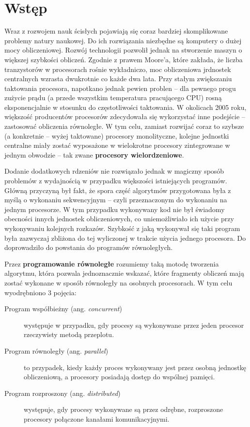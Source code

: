\section{Wstęp}

Wraz z rozwojem nauk ścisłych pojawiają się coraz bardziej skomplikowane problemy natury naukowej. Do ich rozwiązania niezbędne są komputery o dużej mocy obliczeniowej. Rozwój technologii pozwolił jednak na stworzenie maszyn o większej szybkości obliczeń. Zgodnie z prawem Moore'a, które zakłada, że liczba tranzystorów w procesorach rośnie wykładniczo, moc obliczeniowa jrdnostek centralnych wzrasta dwukrotnie co każde dwa lata. Przy stałym zwiększaniu taktowania procesora, napotkano jednak pewien problen -- dla pewnego progu zużycie prądu (a przede wszystkim temperatura pracującego CPU) rosną eksponencjalnie w stosunku do częstotliwości taktowania. W okolicach 2005 roku, większość producentów procesorów zdecydowała się wykorzystać inne podejście -- zastosować obliczenia równoległe. W tym celu, zamiast rozwijać coraz to szybsze (a konkretnie -- wyżej taktowane) procesory monolityczne, kolejne jednostki centralne miały zostać wyposażone w wielokrotne procesory zintegrowane w jednym obwodzie -- tak zwane \textbf{procesory wielordzeniowe}.

Dodanie dodatkowych rdzeniów nie rozwiązało jednak w magiczny sposób problemów z wydajnością w przypadku większości istniejących programów. Główną przyczyną był fakt, że spora część algorytmów przygotowana była z myślą o wykonaniu sekwencyjnym -- czyli przeznaczonym do wykonaniu na jednym procesorze. W tym przypadku wykonywany kod nie był świadomy obecności innych jednostek obliczeniowych, co uniemożliwiało ich użycie przy wykonywaniu kolejnych rozkazów. Szybkość z jaką wykonywał się taki program była zazwyczaj zbliżona do tej wyliczonej w trakcie użycia jednego procesora. Do doprowadziło do powstania do programów równoległych.

Przez \textbf{programowanie równoległe} rozumiemy taką motodę tworzenia algorytmu, która pozwala jednoznacznie wskazać, które fragmenty obliczeń mają zostać wykonane w sposób równoległy na osobnych procesorach. W tym celu wyodrębniono 3 pojęcia:

\begin{description}
	\item[Program współbieżny (ang. \textit{concurrent})] występuje w przypadku, gdy procesy są wykonywane przez jeden procesor rzeczywisty metodą przeplotu.
	\item[Program równoległy (ang. \textit{parallel})] to przypadek, kiedy każdy proces wykonywany jest przez osobną jednostkę obliczeniową, a procesory posiadają dostęp do wspólnej pamięci.
	\item[Program rozproszony (ang. \textit{distributed})] występuje, gdy procesy wykonywane są przez odrębne, rozproszone procesory połączone kanałami komunikacyjnymi.
\end{description}

